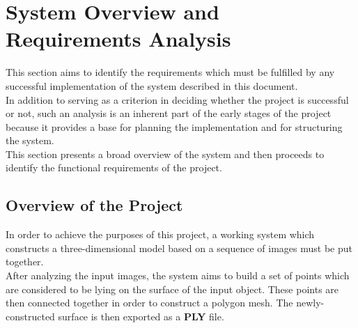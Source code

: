\documentclass[12pt,a4paper,twoside,openright]{report}
\begin{document}

\section{System Overview and Requirements Analysis}
This section aims to identify the requirements which must be fulfilled by any successful implementation of the system described in this document.\\
In addition to serving as a criterion in deciding whether the project is successful or not, such an analysis is an inherent part of the early stages of the project because it provides a base for planning the implementation and for structuring the system.\\
\linebreak
This section presents a broad overview of the system and then proceeds to identify the functional requirements of the project.
\subsection{Overview of the Project}
In order to achieve the purposes of this project, a working system which constructs a three-dimensional model based on a sequence of images must be put together. \\
After analyzing the input images, the system aims to build a set of points which are considered to be lying on the surface of the input object. These points are then connected together in order to construct a polygon mesh. The newly-constructed surface is then exported as a \textbf{PLY} file.\\
\end{document}
